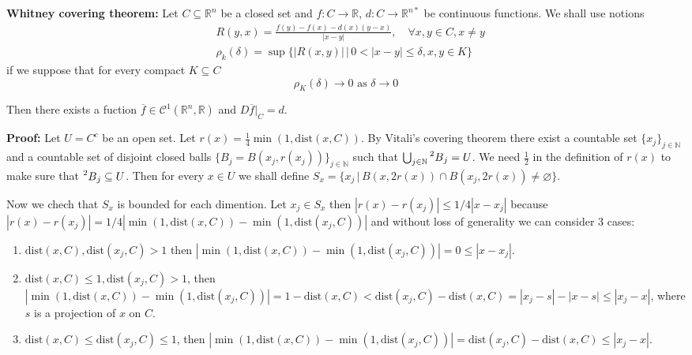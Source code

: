 \documentclass{article}
\begin{document}
\vspace{1ex}
\textbf{Whitney covering theorem:}
Let $C\subseteq \mathbb{R}^n$ be a closed set and $f:C\rightarrow\mathbb R$,
$d:C\rightarrow\mathbb{R}^{n*}$ be continuous functions. We shall use notions
\[
\begin{aligned}
    &R(y,x)=\frac{f(y)-f(x)-d(x)(y-x)}{|x-y|},\quad\forall x,y\in C, x\neq y \\
    &\rho_k(\delta)=\sup\{|R(x,y)|\, |\, 0<|x-y|\leq\delta, x, y\in K\}
\end{aligned}
\]
if we suppose that for every compact $K\subseteq C$
\begin{equation}
\rho_K(\delta)\rightarrow 0\text{ as }\delta\rightarrow 0
\end{equation}

Then there exists a fuction $\overline f\in\mathcal{C}^1(\mathbb{R}^n,\mathbb{R})$
and $D\overline f|_C=d$.

\vspace{1ex}
\textbf{Proof:} Let $U=C^c$ be an open set. Let $r(x)=\frac{1}{4}\min(1,\text{dist}(x,C))$.
By Vitali's covering theorem there exist a countable set
$\{x_j\}_{j\in\mathbb{N}}$ and a countable set of disjoint closed balls $\{B_j=B(x_j, r(x_j))\}_
{j\in\mathbb{N}}$ such that $\bigcup_{j\in\mathbb{N}}\prescript{2}{}B_j=U$. We
need $\frac{1}{2}$ in the definition of $r(x)$ to make sure that $\prescript{2}{}
B_j\subseteq U$. Then for every $x\in U$ we shall define $S_x=\{x_j\,|\,B(x,2r(x))
\cap B(x_j,2r(x))\neq\varnothing\}$. 

\vspace{1ex}
Now we chech that $S_x$ is bounded for each dimention.
Let $x_j\in S_x$ then $|r(x)-r(x_j)| \leq 1/4|x-x_j|$ because $|r(x)-r(x_j)|=
1/4|\min(1,\text{dist}(x,C))-\min(1,\text{dist}(x_j,C))|$ and without loss of
generality we can consider 3 cases:
\begin{enumerate}
    \item $\text{dist}(x,C),\text{dist}(x_j,C)>1$ then $|\min(1,\text{dist}(x,C))
        -\min(1,\text{dist}(x_j,C))|=0\leq|x-x_j|$.
    \item $\text{dist}(x,C)\leq1,\text{dist}(x_j,C)>1$, then $|\min(1,\text{dist}
        (x,C))-\min(1,\text{dist}(x_j,C))| = 1-\text{dist}(x,C)<\text{dist}(x_j,C)
        -\text{dist}(x,C)=|x_j-s|-|x-s|\leq|x_j-x|$, where $s$ is a projection
        of $x$ on $C$. 
    \item $\text{dist}(x,C)\leq\text{dist}(x_j,C)\leq1$, then $|\min(1,\text{dist}
        (x,C))-\min(1,\text{dist}(x_j,C))| = \text{dist}(x_j,C)-\text{dist}(x,C)
        \leq|x_j-x|$.
\end{enumerate}
\end{document}
